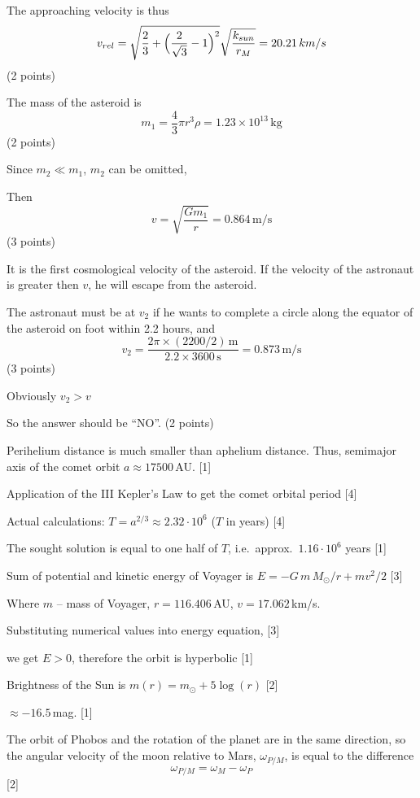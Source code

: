The approaching velocity is thus
\[
  v_{rel} = \sqrt{\frac{2}{3} + \Bigl(\frac{2}{\sqrt{3}} - 1\Bigr)^2}
            \sqrt{\frac{k_{sun}}{r_M}} = 20.21\,km/s
\]
\hfill(2 points)

The mass of the asteroid is
\[
  m_1 = \frac{4}{3}\pi r^3 \rho = 1.23\times 10^{13}\,\mathrm{kg}
\]
\hfill(2 points)

Since $m_2 \ll m_1$, $m_2$ can be omitted,

Then
\[
  v = \sqrt{\frac{Gm_1}{r}} = 0.864\,\mathrm{m/s}
\]
\hfill(3 points)

It is the first cosmological velocity of the asteroid.
If the velocity of the astronaut is greater then $v$, he will escape from the
asteroid.

The astronaut must be at $v_2$ if he wants to complete a circle along the
equator of the asteroid on foot within 2.2 hours, and
\[
  v_2 = \frac{2\pi\times(2200/2)\,\mathrm{m}}{2.2\times 3600\,\mathrm{s}}
      = 0.873\,\mathrm{m/s}
\]
\hfill(3 points)

Obviously $v_2 > v$

So the answer should be ``NO''. \hfill(2 points)

Perihelium distance is much smaller than aphelium distance.
Thus, semimajor axis of the comet orbit $a \approx 17500$\,AU. \hfill[1]

Application of the III Kepler's Law to get the comet orbital period \hfill[4]

Actual calculations:
$T = a^{2/3} \approx 2.32\cdot 10^{6}$ ($T$ in years)
\hfill[4]

The sought solution is equal to one half of $T$, i.e.\ approx.\
$1.16\cdot 10^{6}$ years \hfill[1]

Sum of potential and kinetic energy of Voyager is
$E = -G\,m\,M_\odot/r + mv^2/2$ \hfill[3]

Where $m$ -- mass of Voyager, $r = 116.406$\,AU, $v = 17.062$\,km/s.

Substituting numerical values into energy equation, \hfill[3]

we get $E > 0$, therefore the orbit is hyperbolic \hfill[1]

Brightness of the Sun is $m(r) = m_\odot + 5\log(r)$ \hfill[2]

$\approx -16.5$\,mag. \hfill[1]

The orbit of Phobos and the rotation of the planet are in the same direction,
so the angular velocity of the moon relative to Mars, $\omega_{P/M}$, is equal
to the difference
\[
  \omega_{P/M} = \omega_M - \omega_P
\]
\hfill[2]

